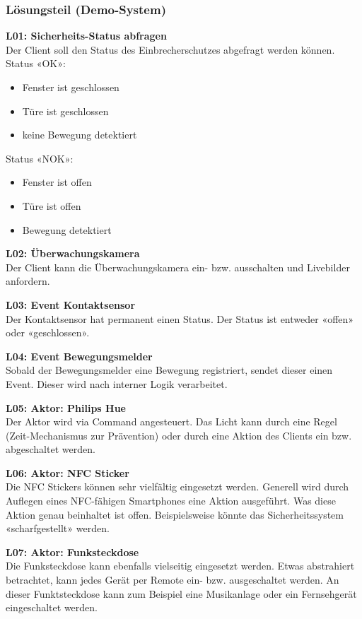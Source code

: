 \subsubsection{Lösungsteil (Demo-System)}
\textbf{L01: Sicherheits-Status abfragen} \\
Der Client soll den Status des Einbrecherschutzes abgefragt werden können. \\
Status «OK»:
\begin{itemize}
	\item Fenster ist geschlossen
	\item Türe ist geschlossen
	\item keine Bewegung detektiert
\end{itemize}
Status «NOK»:
\begin{itemize}
	\item Fenster ist offen
	\item Türe ist offen
	\item Bewegung detektiert
\end{itemize}

\textbf{L02: Überwachungskamera} \\
Der Client kann die Überwachungskamera ein- bzw. ausschalten und Livebilder anfordern.

\textbf{L03: Event Kontaktsensor} \\
Der Kontaktsensor hat permanent einen Status. Der Status ist entweder «offen» oder «geschlossen».

\textbf{L04: Event Bewegungsmelder} \\
Sobald der Bewegungsmelder eine Bewegung registriert, sendet dieser einen Event. Dieser wird nach interner Logik verarbeitet.

\textbf{L05: Aktor: Philips Hue} \\
Der Aktor wird via Command angesteuert. Das Licht kann durch eine Regel (Zeit-Mechanismus zur Prävention) oder durch eine Aktion des Clients ein bzw. abgeschaltet werden.

\textbf{L06: Aktor: NFC Sticker} \\
Die NFC Stickers können sehr vielfältig eingesetzt werden. Generell wird durch Auflegen eines NFC-fähigen Smartphones eine Aktion ausgeführt. Was diese Aktion genau beinhaltet ist offen. Beispielsweise könnte das Sicherheitssystem «scharfgestellt» werden.

\textbf{L07: Aktor: Funksteckdose} \\
Die Funksteckdose kann ebenfalls vielseitig eingesetzt werden. Etwas abstrahiert betrachtet, kann jedes Gerät per Remote ein- bzw. ausgeschaltet werden. An dieser Funktsteckdose kann zum Beispiel eine Musikanlage oder ein Fernsehgerät eingeschaltet werden.